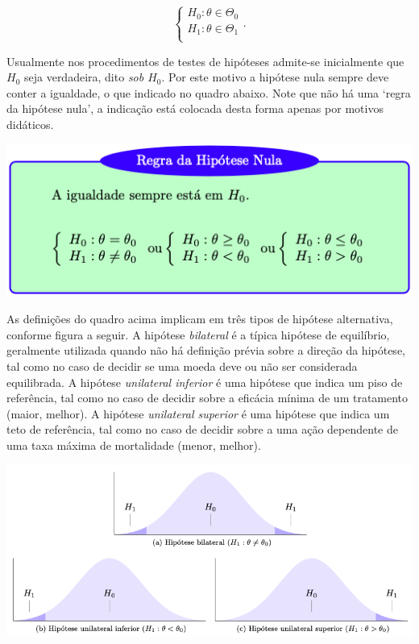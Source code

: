 \documentclass[
]{book}
\theoremstyle{definition}
\theoremstyle{definition}
\theoremstyle{definition}
\theoremstyle{remark}
\begin{document}
\[\left\{ 
    \begin{array}{l}
      H_0: \theta \in \Theta_0\\
      H_1: \theta \in \Theta_1 \\ \end{array} \right. .\]

Usualmente nos procedimentos de testes de hipóteses admite-se inicialmente que \(H_0\) seja verdadeira, dito \emph{sob \(H_0\)}. Por este motivo a hipótese nula sempre deve conter a igualdade, o que indicado no quadro abaixo. Note que não há uma `regra da hipótese nula', a indicação está colocada desta forma apenas por motivos didáticos.

\includegraphics{img/regraH0.png}

As definições do quadro acima implicam em três tipos de hipótese alternativa, conforme figura a seguir. A hipótese \emph{bilateral} é a típica hipótese de equilíbrio, geralmente utilizada quando não há definição prévia sobre a direção da hipótese, tal como no caso de decidir se uma moeda deve ou não ser considerada equilibrada. A hipótese \emph{unilateral inferior} é uma hipótese que indica um piso de referência, tal como no caso de decidir sobre a eficácia mínima de um tratamento (maior, melhor). A hipótese \emph{unilateral superior} é uma hipótese que indica um teto de referência, tal como no caso de decidir sobre a uma ação dependente de uma taxa máxima de mortalidade (menor, melhor).

\includegraphics{img/regraH1.png}
\end{document}

